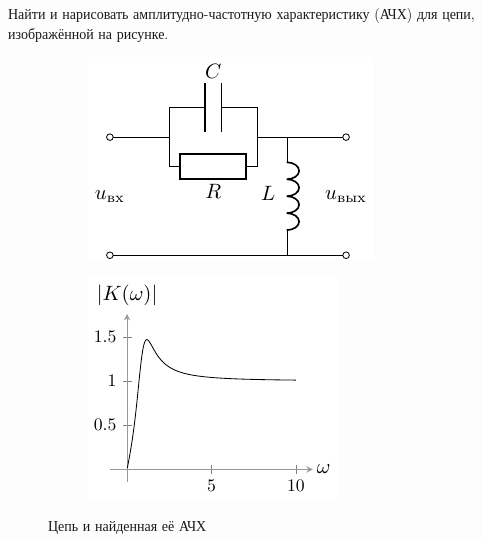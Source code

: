 \begin{task}
	Найти и нарисовать амплитудно-частотную характеристику (АЧХ) для цепи, изображённой на рисунке. 
\end{task}
\vspace{-1em}
\begin{figure}[ht]
  \centering
  \begin{subfigure}[b]{0.5\linewidth}
    \centering\includegraphics[scale=1.8]{chem/task7}
    \vspace{0.15em}
  \end{subfigure}%
  \begin{subfigure}[b]{0.5\linewidth}
    \centering\includegraphics[scale=1.8]{ris/task7_out2}
  \end{subfigure}%
  \caption{Цепь и найденная её АЧХ}
\end{figure}

